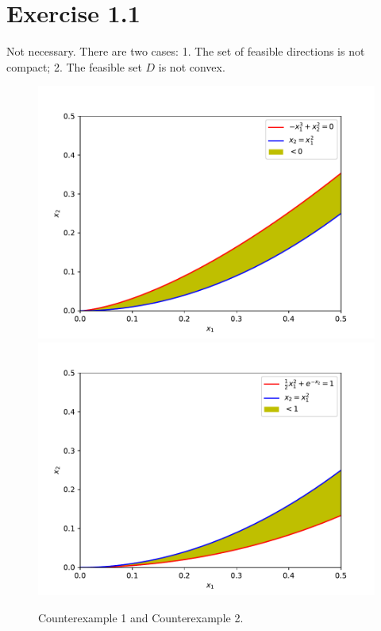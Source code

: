 \documentclass[11pt]{report}
\begin{document}

\section*{Exercise 1.1}
Not necessary. There are two cases: 1. The set of feasible directions is not compact; 2. The feasible set $D$ is not convex.
\begin{figure}
    \centering
    \includegraphics[width=0.45\linewidth]{ECE553/hw1/ece553_hw1_1.pdf}
    \includegraphics[width=0.45\linewidth]{ECE553/hw1/ece553_hw1_2.pdf}
    \caption{Counterexample 1 and Counterexample 2.}
    \label{fig:fig1}
\end{figure}
\end{document}
